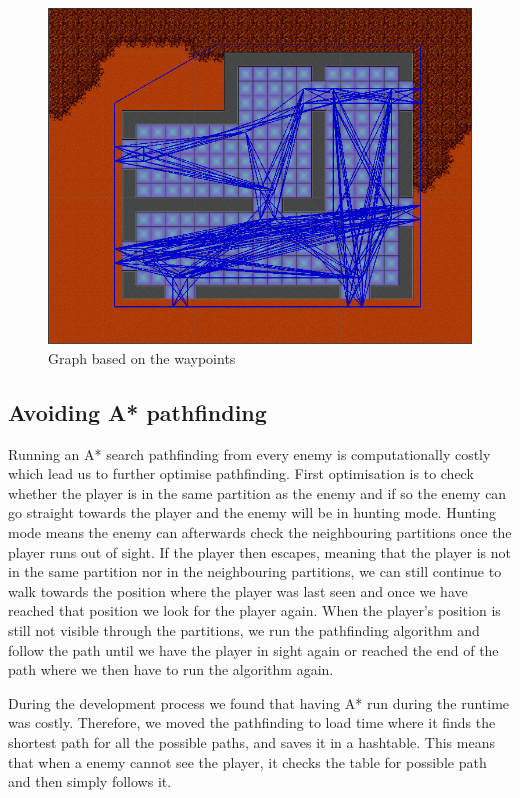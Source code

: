 \begin{figure}[H]
	\includegraphics[width=\textwidth]{figures/astar/waypointsGraph}
	\caption{Graph based on the waypoints}
	\label{waypointgraph}
\end{figure}

\subsection*{Avoiding A* pathfinding}
Running an A* search pathfinding from every enemy is computationally costly which lead us to further optimise pathfinding.
First optimisation is to check whether the player is in the same partition as the enemy and if so the enemy can go straight towards the player and the enemy will be in hunting mode.
Hunting mode means the enemy can afterwards check the neighbouring partitions once the player runs out of sight.
If the player then escapes, meaning that the player is not in the same partition nor in the neighbouring partitions, we can still continue to walk towards the position where the player was last seen and once we have reached that position we look for the player again.
When the player's position is still not visible through the partitions, we run the pathfinding algorithm and follow the path until we have the player in sight again or reached the end of the path where we then have to run the algorithm again.

During the development process we found that having A* run during the runtime was costly.
Therefore, we moved the pathfinding to load time where it finds the shortest path for all the possible paths, and saves it in a hashtable.
This means that when a enemy cannot see the player, it checks the table for possible path and then simply follows it.


